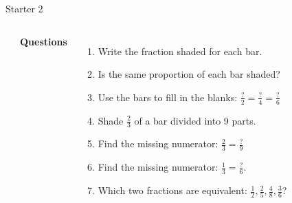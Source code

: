 \documentclass{beamer}
\begin{document}
\begin{frame}{Starter 2}

\begin{columns}
\begin{center}
\end{center}

\textbf{Questions}
\begin{enumerate}
    \item Write the fraction shaded for each bar.
    \item Is the same proportion of each bar shaded?
    \item Use the bars to fill in the blanks: $\frac{?}{2} = \frac{?}{4} = \frac{?}{6}$
    \item Shade $\frac{2}{3}$ of a bar divided into 9 parts. 
    \item Find the missing numerator: $\frac{2}{3} = \frac{?}{9}$
    \item Find the missing numerator: $\frac{1}{3} = \frac{?}{6}$.
    \item Which two fractions are equivalent: $\frac{1}{2}, \frac{2}{5}, \frac{4}{8}, \frac{3}{6}$?
\end{enumerate}
\end{columns}

\end{frame}
\end{document}
